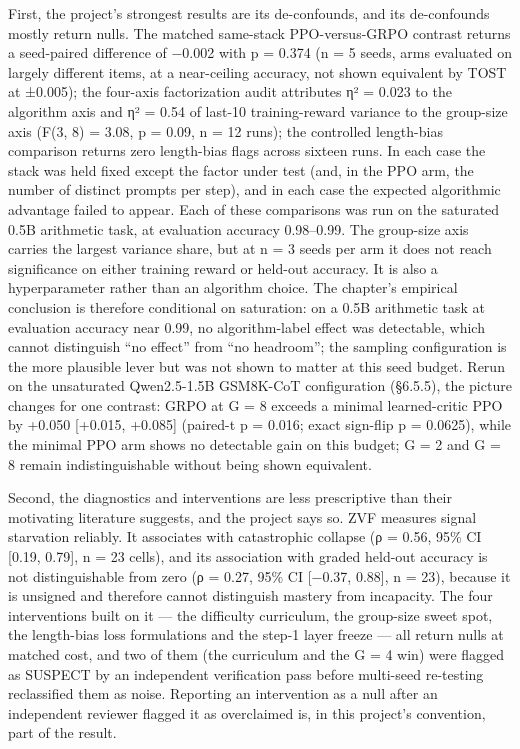 \documentclass[12pt,a4paper]{report}
\begin{document}
First, the project's strongest results are its de-confounds, and its
de-confounds mostly return nulls. The matched same-stack PPO-versus-GRPO
contrast returns a seed-paired difference of −0.002 with p = 0.374 (n =
5 seeds, arms evaluated on largely different items, at a near-ceiling
accuracy, not shown equivalent by TOST at ±0.005); the four-axis
factorization audit attributes η² = 0.023 to the algorithm axis and η² =
0.54 of last-10 training-reward variance to the group-size axis (F(3, 8)
= 3.08, p = 0.09, n = 12 runs); the controlled length-bias comparison
returns zero length-bias flags across sixteen runs. In each case the
stack was held fixed except the factor under test (and, in the PPO arm,
the number of distinct prompts per step), and in each case the expected
algorithmic advantage failed to appear. Each of these comparisons was
run on the saturated 0.5B arithmetic task, at evaluation accuracy
0.98--0.99. The group-size axis carries the largest variance share, but
at n = 3 seeds per arm it does not reach significance on either training
reward or held-out accuracy. It is also a hyperparameter rather than an
algorithm choice. The chapter's empirical conclusion is therefore
conditional on saturation: on a 0.5B arithmetic task at evaluation
accuracy near 0.99, no algorithm-label effect was detectable, which
cannot distinguish ``no effect'' from ``no headroom''; the sampling
configuration is the more plausible lever but was not shown to matter at
this seed budget. Rerun on the unsaturated Qwen2.5-1.5B GSM8K-CoT
configuration (§6.5.5), the picture changes for one contrast: GRPO at G
= 8 exceeds a minimal learned-critic PPO by +0.050 {[}+0.015, +0.085{]}
(paired-t p = 0.016; exact sign-flip p = 0.0625), while the minimal PPO
arm shows no detectable gain on this budget; G = 2 and G = 8 remain
indistinguishable without being shown equivalent.

Second, the diagnostics and interventions are less prescriptive than
their motivating literature suggests, and the project says so. ZVF
measures signal starvation reliably. It associates with catastrophic
collapse (ρ = 0.56, 95\% CI {[}0.19, 0.79{]}, n = 23 cells), and its
association with graded held-out accuracy is not distinguishable from
zero (ρ = 0.27, 95\% CI {[}−0.37, 0.88{]}, n = 23), because it is
unsigned and therefore cannot distinguish mastery from incapacity. The
four interventions built on it --- the difficulty curriculum, the
group-size sweet spot, the length-bias loss formulations and the step-1
layer freeze --- all return nulls at matched cost, and two of them (the
curriculum and the G = 4 win) were flagged as SUSPECT by an independent
verification pass before multi-seed re-testing reclassified them as
noise. Reporting an intervention as a null after an independent reviewer
flagged it as overclaimed is, in this project's convention, part of the
result.
\end{document}

